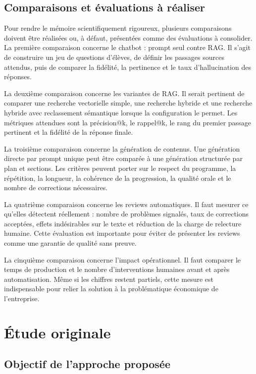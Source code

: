\documentclass[12pt,a4paper]{article}
\begin{document}
\subsection{Comparaisons et évaluations à réaliser}

Pour rendre le mémoire scientifiquement rigoureux, plusieurs comparaisons doivent être
réalisées ou, à défaut, présentées comme des évaluations à consolider. La première
comparaison concerne le chatbot : prompt seul contre RAG. Il s'agit de construire un
jeu de questions d'élèves, de définir les passages sources attendus, puis de comparer la
fidélité, la pertinence et le taux d'hallucination des réponses.

La deuxième comparaison concerne les variantes de RAG. Il serait pertinent de comparer
une recherche vectorielle simple, une recherche hybride et une recherche hybride avec
reclassement sémantique lorsque la configuration le permet. Les métriques attendues
sont la précision@k, le rappel@k, le rang du premier passage pertinent et la fidélité de
la réponse finale.

La troisième comparaison concerne la génération de contenus. Une génération directe par
prompt unique peut être comparée à une génération structurée par plan et sections. Les
critères peuvent porter sur le respect du programme, la répétition, la longueur, la
cohérence de la progression, la qualité orale et le nombre de corrections nécessaires.

La quatrième comparaison concerne les reviews automatiques. Il faut mesurer ce qu'elles
détectent réellement : nombre de problèmes signalés, taux de corrections acceptées,
effets indésirables sur le texte et réduction de la charge de relecture humaine. Cette
évaluation est importante pour éviter de présenter les reviews comme une garantie de
qualité sans preuve.

La cinquième comparaison concerne l'impact opérationnel. Il faut comparer le temps de
production et le nombre d'interventions humaines avant et après automatisation. Même si
les chiffres restent partiels, cette mesure est indispensable pour relier la solution à la
problématique économique de l'entreprise.

\clearpage
\section{Étude originale}

\subsection{Objectif de l'approche proposée}
\end{document}
